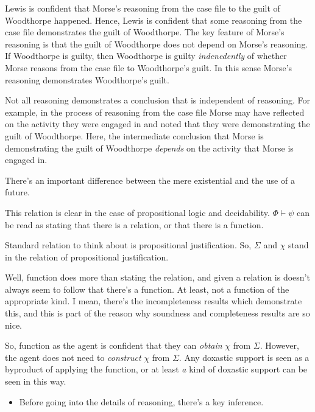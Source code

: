 \documentclass[10pt]{article}
\begin{document}
Lewis is confident that Morse's reasoning from the case file to the guilt of Woodthorpe happened.
Hence, Lewis is confident that some reasoning from the case file demonstrates the guilt of Woodthorpe.
The key feature of Morse's reasoning is that the guilt of Woodthorpe does not depend on Morse's reasoning.
If Woodthorpe is guilty, then Woodthorpe is guilty \emph{indenedently} of whether Morse reasons from the case file to Woodthorpe's guilt.
In this sense Morse's reasoning demonstrates Woodthorpe's guilt.

Not all reasoning demonstrates a conclusion that is independent of reasoning.
For example, in the process of reasoning from the case file Morse may have reflected on the activity they were engaged in and noted that they were demonstrating the guilt of Woodthorpe.
Here, the intermediate conclusion that Morse is demonstrating the guilt of Woodthorpe \emph{depends} on the activity that Morse is engaged in.

\begin{note}[Observation]
There's an important difference between the mere existential and the use of a future.
\end{note}

\begin{note}
  This relation is clear in the case of propositional logic and decidability.
  \(\Phi \vdash \psi\) can be read as stating that there is a relation, or that there is a function.

  Standard relation to think about is propositional justification.
  So, \(\Sigma\) and \(\chi\) stand in the relation of propositional justification.

  Well, function does more than stating the relation, and given a relation is doesn't always seem to follow that there's a function.
  At least, not a function of the appropriate kind.
  I mean, there's the incompleteness results which demonstrate this, and this is part of the reason why soundness and completeness results are so nice.

  So, function as the agent is confident that they can \emph{obtain} \(\chi\) from \(\Sigma\).
  However, the agent does not need to \emph{construct} \(\chi\) from \(\Sigma\).
  Any doxastic support is seen as a byproduct of applying the function, or at least \emph{a} kind of doxastic support can be seen in this way.
\end{note}


\begin{itemize}
\item Before going into the details of reasoning, there's a key inference.
\end{itemize}
\end{document}
